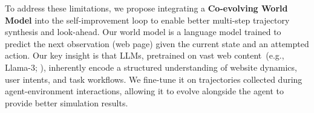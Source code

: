 \documentclass[11pt]{article}
\begin{document}
To address these limitations, we propose integrating a \textbf{Co-evolving World Model} into the self-improvement loop to enable better multi-step trajectory synthesis and look-ahead. 
Our world model is a language model trained to predict the next observation (web page) given the current state and an attempted action.
Our key insight is that LLMs, pretrained on vast web content~(e.g., Llama-3; \citealp{llama3}), inherently encode a structured understanding of website dynamics, user intents, and task workflows. 
We fine-tune it on trajectories collected during agent-environment interactions, allowing it to evolve alongside the agent to provide better simulation results.

\end{document}
